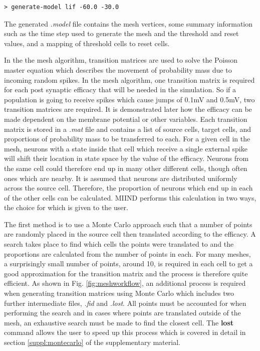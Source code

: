 \documentclass[utf8]{frontiersSCNS} %
\begin{document}
\begin{lstlisting}[language=xml,caption={Generate a Model in the CLI}]
> generate-model lif -60.0 -30.0
\end{lstlisting}

The generated \textit{.model} file contains the mesh vertices, some summary information such as the time step used to generate the mesh and the threshold and reset values, and a mapping of threshold cells to reset cells.

In the the mesh algorithm, transition matrices are used to solve the Poisson master equation which describes the movement of probability mass due to incoming random spikes. In the mesh algorithm, one transition matrix is required for each post synaptic efficacy that will be needed in the simulation. So if a population is going to receive spikes which cause jumps of 0.1mV and 0.5mV, two transition matrices are required. It is demonstrated later how the efficacy can be made dependent on the membrane potential or other variables. Each transition matrix is stored in a \textit{.mat} file and contains a list of source cells, target cells, and proportions of probability mass to be transferred to each. For a given cell in the mesh, neurons with a state inside that cell which receive a single external spike will shift their location in state space by the value of the efficacy. Neurons from the same cell could therefore end up in many other different cells, though often ones which are nearby. It is assumed that neurons are distributed uniformly across the source cell. Therefore, the proportion of neurons which end up in each of the other cells can be calculated. MIIND performs this calculation in two ways, the choice for which is given to the user.

The first method is to use a Monte Carlo approach such that a number of points are randomly placed in the source cell then translated according to the efficacy. A search takes place to find which cells the points were translated to and the proportions are calculated from the number of points in each. For many meshes, a surprisingly small number of points, around 10, is required in each cell to get a good approximation for the transition matrix and the process is therefore quite efficient. As shown in Fig. \ref{fig:meshworkflow}, an additional process is required when generating transition matrices using Monte Carlo which includes two further intermediate files, \textit{.fid} and \textit{.lost}. All points must be accounted for when performing the search and in cases where points are translated outside of the mesh, an exhaustive search must be made to find the closest cell. The \textbf{lost} command allows the user to speed up this process which is covered in detail in section \ref{suppl:montecarlo} of the supplementary material.
\end{document}
